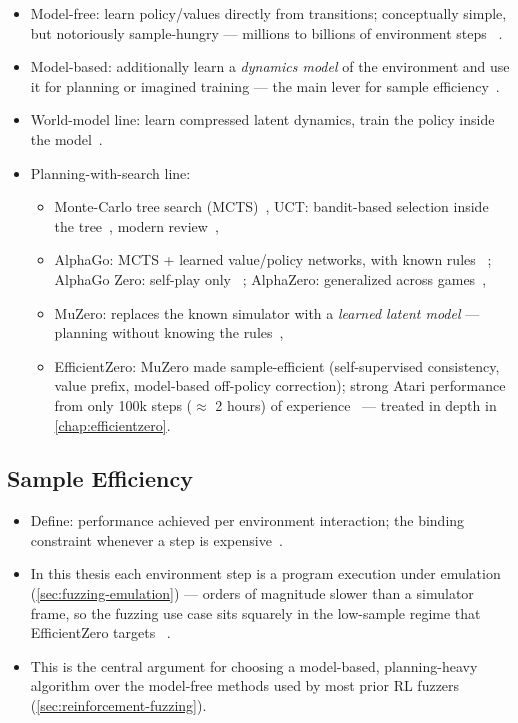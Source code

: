 \begin{itemize}
  \item Model-free: learn policy/values directly from transitions; conceptually simple, but
    notoriously sample-hungry --- millions to billions of environment steps
    ~\cite{mnih_human-level_2015,moerland_model-based_2022}.
  \item Model-based: additionally learn a \emph{dynamics model} of the environment and use it for
    planning or imagined training --- the main lever for sample
    efficiency~\cite{moerland_model-based_2022,kaiser_model-based_2024}.
  \item World-model line: learn compressed latent dynamics, train the policy inside the
    model~\cite{ha_world_2018,hafner_learning_2019,hafner_mastering_2024}.
  \item Planning-with-search line:
    \begin{itemize}
      \item Monte-Carlo tree search (MCTS)~\cite{hutchison_efficient_2007}, UCT: bandit-based
        selection inside the tree~\cite{hutchison_bandit_2006}, modern
        review~\cite{swiechowski_monte_2023},
      \item AlphaGo: MCTS + learned value/policy networks, with known rules
        ~\cite{silver_mastering_2016}; AlphaGo Zero: self-play only
        ~\cite{silver_mastering_2017-1}; AlphaZero: generalized across
        games~\cite{silver_general_2018},
      \item MuZero: replaces the known simulator with a \emph{learned latent model} --- planning
        without knowing the rules~\cite{schrittwieser_mastering_2020},
      \item EfficientZero: MuZero made sample-efficient (self-supervised consistency, value
        prefix, model-based off-policy correction); strong Atari performance from only 100k
        steps ($\approx$ 2 hours) of experience~\cite{ye_mastering_2021} --- treated in depth in
        \cref{chap:efficientzero}.
    \end{itemize}
\end{itemize}

\subsection{Sample Efficiency}\label{sec:rl-sample-efficiency}

\begin{itemize}
  \item Define: performance achieved per environment interaction; the binding constraint whenever
    a step is expensive~\cite{moerland_model-based_2022,ye_mastering_2021}.
  \item In this thesis each environment step is a program execution under emulation
    (\cref{sec:fuzzing-emulation}) --- orders of magnitude slower than a simulator frame, so the
    fuzzing use case sits squarely in the low-sample regime that EfficientZero targets
    ~\cite{ye_mastering_2021}.
  \item This is the central argument for choosing a model-based, planning-heavy algorithm over the
    model-free methods used by most prior RL fuzzers (\cref{sec:reinforcement-fuzzing}).
\end{itemize}
